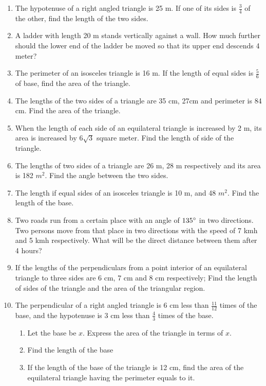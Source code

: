 \begin{enumerate}
	\item The hypotenuse of a right angled triangle is 25 m. If one of its sides is $\frac{3}{4}$ of the other, find the length of the two sides.
	\item A ladder with length 20 m stands vertically against a wall. How much further should the lower end of the ladder be moved so that its upper end descends 4 meter?
	\item The perimeter of an isosceles triangle is 16 m. If the length of equal sides is $\frac{5}{6}$ of base, find the area of the triangle.
	\item The lengths of the two sides of a triangle are 35 cm, 27cm and perimeter is 84 cm. Find the area of the triangle.
	\item When the length of each side of an equilateral triangle is increased by 2 m, its area is increased by $6\sqrt{3}$ square meter. Find the length of side of the triangle.
	\item The lengths of two sides of a triangle are 26 m, 28 m respectively and its area is 182 $m^2$. Find the angle between the two sides.
	\item The length if equal sides of an isosceles triangle is 10 m, and 48 $m^2$. Find the length of the base.
	\item Two roads run from a certain place with an angle of $135\degree$ in two directions. Two persons move from that place in two directions with the speed of 7 kmh and 5 kmh respectively. What will be the direct distance between them after 4 hours?
	\item If the lengths of the perpendiculars from a point interior of an equilateral triangle to three sides are 6 cm, 7 cm and 8 cm respectively; Find the length of sides of the triangle and the area of the triangular region.
	\item The perpendicular of a right angled triangle is 6 cm less than $\frac{11}{12}$ times of the base, and the hypotenuse is 3 cm less than $\frac{4}{3}$ times of the base.
	\begin{enumerate}
		\item Let the base be $x$. Express the area of the triangle in terms of $x$.
		\item Find the length of the base
		\item If the length of the base of the triangle is 12 cm, find the area of the equilateral triangle having the perimeter equals to it.
	\end{enumerate}
\end{enumerate}







































